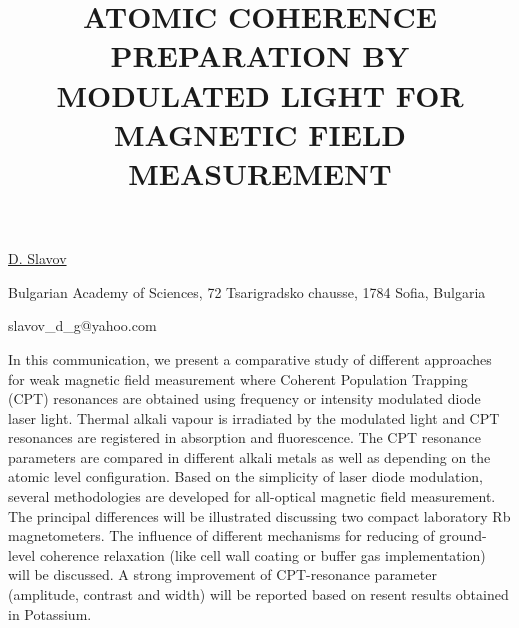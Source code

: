 \title{ATOMIC COHERENCE PREPARATION BY MODULATED LIGHT FOR MAGNETIC FIELD MEASUREMENT}

\underline{D. Slavov} 

{\normalsize{\vspace{-4mm}
Bulgarian Academy of Sciences, 72 Tsarigradsko chausse, 1784 Sofia,
Bulgaria

\email slavov\_d\_g@yahoo.com}}

In this communication, we present a comparative study of different approaches for weak magnetic field measurement where Coherent Population Trapping (CPT) resonances are obtained using frequency or intensity modulated diode laser light. Thermal alkali vapour is irradiated by the modulated light and CPT resonances are registered in absorption and fluorescence. The CPT resonance parameters are compared in different alkali metals as well as depending on the atomic level configuration.
Based on the simplicity of laser diode modulation, several methodologies are developed for all-optical magnetic field measurement. The principal differences will be illustrated discussing two compact laboratory Rb magnetometers.
The influence of different mechanisms for reducing of ground-level coherence relaxation (like cell wall coating or buffer gas implementation) will be discussed. A strong improvement of CPT-resonance parameter (amplitude, contrast and width) will be reported based on resent results obtained in Potassium.

\vspace{\baselineskip}